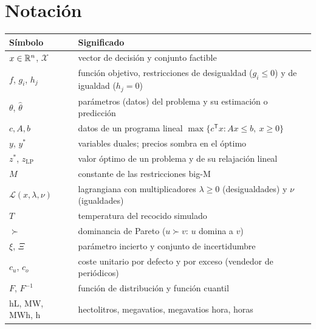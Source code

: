 \documentclass[11pt,a4paper,twoside,openany]{book}
\newcommand{\T}{^{\mathsf{T}}}
\newcommand{\Lag}{\mathcal{L}}
\begin{document}
\section*{Notación}
\begin{center}\small
\begin{tabularx}{\textwidth}{@{}l>{\raggedright\arraybackslash}X@{}}
\toprule
Símbolo & Significado \\
\midrule
$x\in\mathbb{R}^{n}$, $\mathcal{X}$ & vector de decisión y conjunto factible \\
$f$, $g_i$, $h_j$ & función objetivo, restricciones de desigualdad ($g_i\le 0$) y de igualdad ($h_j=0$) \\
$\theta$, $\hat\theta$ & parámetros (datos) del problema y su estimación o predicción \\
$c,A,b$ & datos de un programa lineal $\max\{c\T x: Ax\le b,\ x\ge 0\}$ \\
$y$, $y^{*}$ & variables duales; precios sombra en el óptimo \\
$z^{*}$, $z_{\mathrm{LP}}$ & valor óptimo de un problema y de su relajación lineal \\
$M$ & constante de las restricciones big-M \\
$\Lag(x,\lambda,\nu)$ & lagrangiana con multiplicadores $\lambda\ge 0$ (desigualdades) y $\nu$ (igualdades) \\
$T$ & temperatura del recocido simulado \\
$\succ$ & dominancia de Pareto ($u\succ v$: $u$ domina a $v$) \\
$\xi$, $\Xi$ & parámetro incierto y conjunto de incertidumbre \\
$c_u$, $c_o$ & coste unitario por defecto y por exceso (vendedor de periódicos) \\
$F$, $F^{-1}$ & función de distribución y función cuantil \\
hL, MW, MWh, h & hectolitros, megavatios, megavatios hora, horas \\
\bottomrule
\end{tabularx}
\end{center}

\tableofcontents

\mainmatter







\appendix


\backmatter

\end{document}
